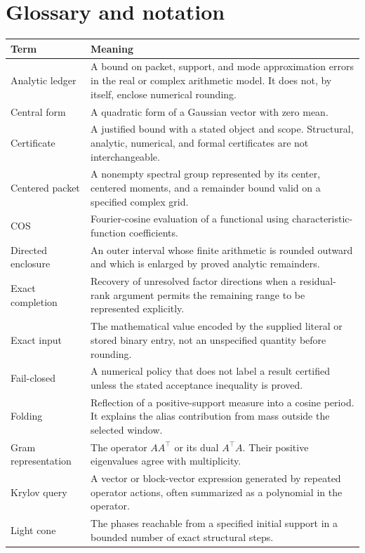 \chapter{Glossary and notation}\label{app:glossary}
\begingroup
\small
\renewcommand{\arraystretch}{1.08}


\begin{longtable}{@{}P{.25\linewidth}P{.70\linewidth}@{}}
\toprule
Term & Meaning\\
\midrule
\endhead
Analytic ledger & A bound on packet, support, and mode approximation errors in the real or complex arithmetic model. It does not, by itself, enclose numerical rounding.\\
Central form & A quadratic form of a Gaussian vector with zero mean.\\
Certificate & A justified bound with a stated object and scope. Structural, analytic, numerical, and formal certificates are not interchangeable.\\
Centered packet & A nonempty spectral group represented by its center, centered moments, and a remainder bound valid on a specified complex grid.\\
COS & Fourier-cosine evaluation of a functional using characteristic-function coefficients.\\
Directed enclosure & An outer interval whose finite arithmetic is rounded outward and which is enlarged by proved analytic remainders.\\
Exact completion & Recovery of unresolved factor directions when a residual-rank argument permits the remaining range to be represented explicitly.\\
Exact input & The mathematical value encoded by the supplied literal or stored binary entry, not an unspecified quantity before rounding.\\
Fail-closed & A numerical policy that does not label a result certified unless the stated acceptance inequality is proved.\\
Folding & Reflection of a positive-support measure into a cosine period. It explains the alias contribution from mass outside the selected window.\\
Gram representation & The operator $AA^\top$ or its dual $A^\top A$. Their positive eigenvalues agree with multiplicity.\\
Krylov query & A vector or block-vector expression generated by repeated operator actions, often summarized as a polynomial in the operator.\\
Light cone & The phases reachable from a specified initial support in a bounded number of exact structural steps.\\

\end{longtable}
